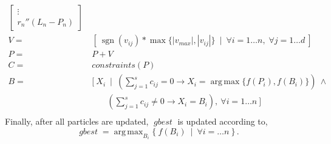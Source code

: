 \documentclass[10pt]{article}
\DeclareMathOperator*{\argmax}{arg\,max}
\DeclareMathOperator*{\sgn}{sgn}
\DeclareMathOperator*{\gbest}{\mathit{gbest}}
\begin{document}
\begin{appendices}
\begin{align*}
\begin{bmatrix}
      \vdots\\
      {r_n}''(L_n - P_n)
    \end{bmatrix}\\
    V  =&\ \left[\ \sgn(v_{ij})*\max\{|v_{max}|,|v_{ij}|\}\ \mid\ \forall i=1\dots n,\;\forall j=1\dots d\ \right]\\
    P  =&\ P + V\\
    C  =&\ \mathit{constraints}(P)\\
    B  =&\ [\ X_i\ \mid\ (\textstyle\sum_{j=1}^s c_{ij} = 0 \to X_i = \argmax\{f(P_i), f(B_i)\})\ \wedge\\
        &\qquad(\textstyle\sum_{j=1}^s c_{ij} \neq 0 \to X_i = B_i),\ \forall i=1\dots n\ ]\\
  \end{align*}
  Finally, after all particles are updated, $\gbest$ is updated according to,
  \begin{equation*}
    \gbest = \argmax_{{B}_i} \{\ {f(B_i)}\ \mid\ \forall i=\dots n\ \}\,.
  \end{equation*}

\end{appendices}
\end{document}
